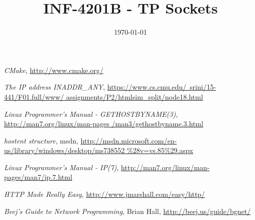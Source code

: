 \documentclass[a4paper, frenchb, 11pt]{article}
\title{
	\textbf{INF-4201B - TP Sockets}\\
}
\date{\today}
\begin{document}
\maketitle
\newpage

\tableofcontents
\newpage


\newpage


\newpage


\newpage


\newpage


\newpage


\newpage

\renewcommand\refname{Ressources utilisées}
\begin{thebibliography}{5}
 \emph{CMake}, \href{http://www.cmake.org/}{http://www.cmake.org/}

 \emph{The IP address INADDR\_ANY}, \href{https://www.cs.cmu.edu/~srini/15-441/F01.full/www/assignments/P2/htmlsim_split/node18.html}{https://www.cs.cmu.edu/~srini/15-441/F01.full/www/ assignments/P2/htmlsim\_split/node18.html}

 \emph{Linux Programmer's Manual - GETHOSTBYNAME(3)}, \href{http://man7.org/linux/man-pages/man3/gethostbyname.3.html}{http://man7.org/linux/man-pages /man3/gethostbyname.3.html}

 \emph{hostent structure}, msdn, \href{http://msdn.microsoft.com/en-us/library/windows/desktop/ms738552%28v=vs.85%29.aspx}{http://msdn.microsoft.com/en-us/library/windows/desktop/ms738552 \%28v=vs.85\%29.aspx}

 \emph{Linux Programmer's Manual - IP(7)}, \href{http://man7.org/linux/man-pages/man7/ip.7.html}{http://man7.org/linux/man-pages/man7/ip.7.html}

 \emph{HTTP Made Really Easy}, \href{http://www.jmarshall.com/easy/http/}{http://www.jmarshall.com/easy/http/}

 \emph{Beej's Guide to Network Programming}, Brian Hall, \href{http://beej.us/guide/bgnet/}{http://beej.us/guide/bgnet/}
\end{thebibliography}
\end{document}
